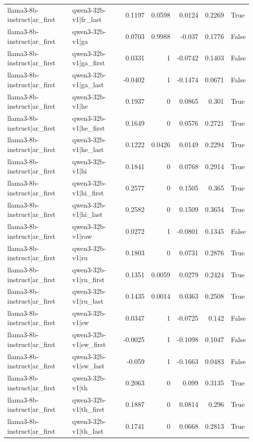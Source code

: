 \begin{table}
\begin{tabular}{l l r r r r l}
llama3-8b-instruct|ar_first & qwen3-32b-v1|fr_last & 0.1197 & 0.0598 & 0.0124 & 0.2269 & True \\
llama3-8b-instruct|ar_first & qwen3-32b-v1|ga & 0.0703 & 0.9988 & -0.037 & 0.1776 & False \\
llama3-8b-instruct|ar_first & qwen3-32b-v1|ga_first & 0.0331 & 1 & -0.0742 & 0.1403 & False \\
llama3-8b-instruct|ar_first & qwen3-32b-v1|ga_last & -0.0402 & 1 & -0.1474 & 0.0671 & False \\
llama3-8b-instruct|ar_first & qwen3-32b-v1|he & 0.1937 & 0 & 0.0865 & 0.301 & True \\
llama3-8b-instruct|ar_first & qwen3-32b-v1|he_first & 0.1649 & 0 & 0.0576 & 0.2721 & True \\
llama3-8b-instruct|ar_first & qwen3-32b-v1|he_last & 0.1222 & 0.0426 & 0.0149 & 0.2294 & True \\
llama3-8b-instruct|ar_first & qwen3-32b-v1|hi & 0.1841 & 0 & 0.0768 & 0.2914 & True \\
llama3-8b-instruct|ar_first & qwen3-32b-v1|hi_first & 0.2577 & 0 & 0.1505 & 0.365 & True \\
llama3-8b-instruct|ar_first & qwen3-32b-v1|hi_last & 0.2582 & 0 & 0.1509 & 0.3654 & True \\
llama3-8b-instruct|ar_first & qwen3-32b-v1|raw & 0.0272 & 1 & -0.0801 & 0.1345 & False \\
llama3-8b-instruct|ar_first & qwen3-32b-v1|ru & 0.1803 & 0 & 0.0731 & 0.2876 & True \\
llama3-8b-instruct|ar_first & qwen3-32b-v1|ru_first & 0.1351 & 0.0059 & 0.0279 & 0.2424 & True \\
llama3-8b-instruct|ar_first & qwen3-32b-v1|ru_last & 0.1435 & 0.0014 & 0.0363 & 0.2508 & True \\
llama3-8b-instruct|ar_first & qwen3-32b-v1|sw & 0.0347 & 1 & -0.0725 & 0.142 & False \\
llama3-8b-instruct|ar_first & qwen3-32b-v1|sw_first & -0.0025 & 1 & -0.1098 & 0.1047 & False \\
llama3-8b-instruct|ar_first & qwen3-32b-v1|sw_last & -0.059 & 1 & -0.1663 & 0.0483 & False \\
llama3-8b-instruct|ar_first & qwen3-32b-v1|th & 0.2063 & 0 & 0.099 & 0.3135 & True \\
llama3-8b-instruct|ar_first & qwen3-32b-v1|th_first & 0.1887 & 0 & 0.0814 & 0.296 & True \\
llama3-8b-instruct|ar_first & qwen3-32b-v1|th_last & 0.1741 & 0 & 0.0668 & 0.2813 & True \\

\end{tabular}
\end{table}
